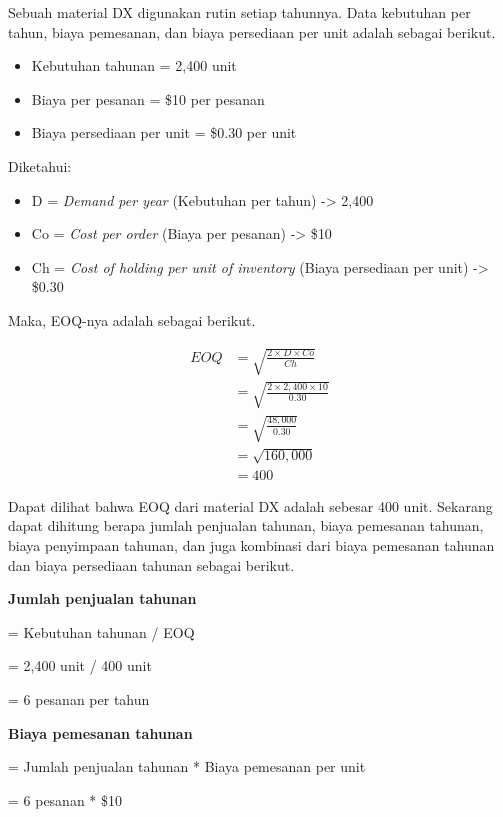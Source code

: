 Sebuah material DX digunakan rutin setiap tahunnya. Data kebutuhan per tahun, biaya pemesanan, dan biaya persediaan per unit adalah sebagai berikut.

\begin{itemize}
	\item Kebutuhan tahunan = 2,400 unit
	\item Biaya per pesanan = \${10} per pesanan
	\item Biaya persediaan per unit = \${0.30} per unit
\end{itemize}

Diketahui:
\begin{itemize}
	\item D = \textit{Demand per year} (Kebutuhan per tahun) -> 2,400
	\item Co = \textit{Cost per order} (Biaya per pesanan) -> \${10}
	\item Ch = \textit{Cost of holding per unit of inventory} (Biaya persediaan per unit) -> \${0.30}
\end{itemize}

Maka, EOQ-nya adalah sebagai berikut.

\begin{equation}
    \begin{split}
		EOQ
		&= \sqrt{\frac{2 \times D \times Co}{Ch}} \\
		&= \sqrt{\frac{2 \times 2,400 \times 10}{0.30}} \\
		&= \sqrt{\frac{48,000}{0.30}} \\
		&= \sqrt{160,000} \\
		&= 400
    \end{split}
\end{equation}

Dapat dilihat bahwa EOQ dari material DX adalah sebesar 400 unit. Sekarang dapat dihitung berapa jumlah penjualan tahunan, biaya pemesanan tahunan, biaya penyimpaan tahunan, dan juga kombinasi dari biaya pemesanan tahunan dan biaya persediaan tahunan sebagai berikut.

\textbf{Jumlah penjualan tahunan}

= Kebutuhan tahunan / EOQ

= 2,400 unit / 400 unit

= 6 pesanan per tahun

\textbf{Biaya pemesanan tahunan}

= Jumlah penjualan tahunan * Biaya pemesanan per unit

= 6 pesanan * \${10}

